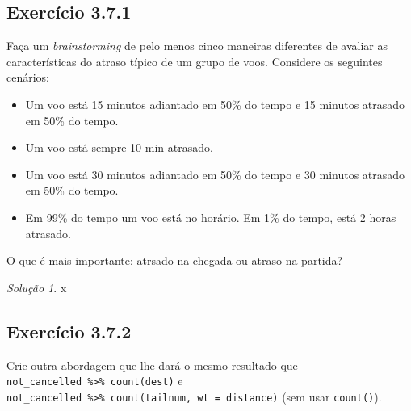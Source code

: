 \documentclass[
]{latex/krantz}
\providecommand{\tightlist}{%
  \setlength{\itemsep}{0pt}\setlength{\parskip}{0pt}}
\theoremstyle{definition}
\theoremstyle{definition}
\theoremstyle{definition}
\theoremstyle{definition}
\theoremstyle{remark}
\newtheorem*{solution}{Solução}
\begin{document}
\hypertarget{exr3-7-1}{%
\subsection*{Exercício 3.7.1}\label{exr3-7-1}}

Faça um \emph{brainstorming} de pelo menos cinco maneiras diferentes de avaliar as características do atraso típico de um grupo de voos. Considere os seguintes cenários:

\begin{itemize}
\tightlist
\item
  Um voo está 15 minutos adiantado em 50\% do tempo e 15 minutos atrasado em 50\% do tempo.
\item
  Um voo está sempre 10 min atrasado.
\item
  Um voo está 30 minutos adiantado em 50\% do tempo e 30 minutos atrasado em 50\% do tempo.
\item
  Em 99\% do tempo um voo está no horário. Em 1\% do tempo, está 2 horas atrasado.
\end{itemize}

O que é mais importante: atrsado na chegada ou atraso na partida?

\begin{solution}
x
\end{solution}

\hypertarget{exr3-7-2}{%
\subsection*{Exercício 3.7.2}\label{exr3-7-2}}

Crie outra abordagem que lhe dará o mesmo resultado que \texttt{not\_cancelled\ \%\textgreater{}\%\ count(dest)} e \texttt{not\_cancelled\ \%\textgreater{}\%\ count(tailnum,\ wt\ =\ distance)} (sem usar \texttt{count()}).
\end{document}
